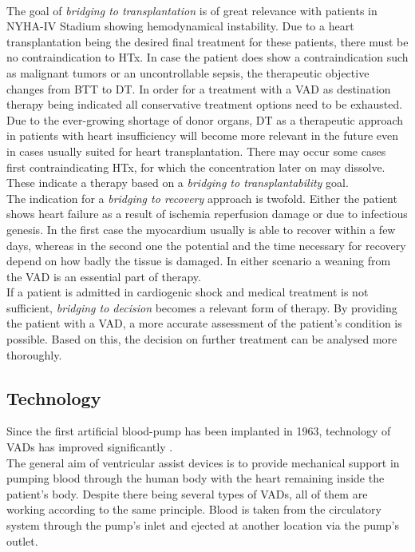 \\The goal of \textit{bridging to transplantation} is of great relevance with patients in NYHA-IV Stadium showing hemodynamical instability. Due to a heart transplantation being the desired final treatment for these patients, there must be no contraindication to HTx. In case the patient does show a contraindication such as malignant tumors or an uncontrollable sepsis, the therapeutic objective changes from BTT to DT. In order for a treatment with a VAD as destination therapy being indicated all conservative treatment options need to be exhausted. Due to the ever-growing shortage of donor organs, DT as a therapeutic approach in patients with heart insufficiency will become more relevant in the future even in cases usually suited for heart transplantation. \cite{VAD7} There may occur some cases first contraindicating HTx, for which the concentration later on may dissolve. These indicate a therapy based on a \textit{bridging to transplantability} goal. \cite{VAD6}
\\The indication for a \textit{bridging to recovery} approach is twofold. Either the patient shows heart failure as a result of ischemia reperfusion damage or due to infectious genesis. In the first case the myocardium usually is able to recover within a few days, whereas in the second one the potential and the time necessary for recovery depend on how badly the tissue is damaged. In either scenario a weaning from the VAD is an essential part of therapy. \cite{VAD7}
\\If a patient is admitted in cardiogenic shock and medical treatment is not sufficient, \textit{bridging to decision} becomes a relevant form of therapy. By providing the patient with a VAD, a more accurate assessment of the patient's condition is possible.
Based on this, the decision on further treatment can be analysed more thoroughly. \cite{VAD6}

\subsection{Technology}
Since the first artificial blood-pump has been implanted in 1963, technology of VADs has improved significantly \cite{VAD9}.
\\The general aim of ventricular assist devices is to provide mechanical support in pumping blood through the human body with the heart remaining inside the patient's body. Despite there being several types of VADs, all of them are working according to the same principle. Blood is taken from the circulatory system through the pump's inlet and ejected at another location via the pump's outlet. \cite{VAD1}


